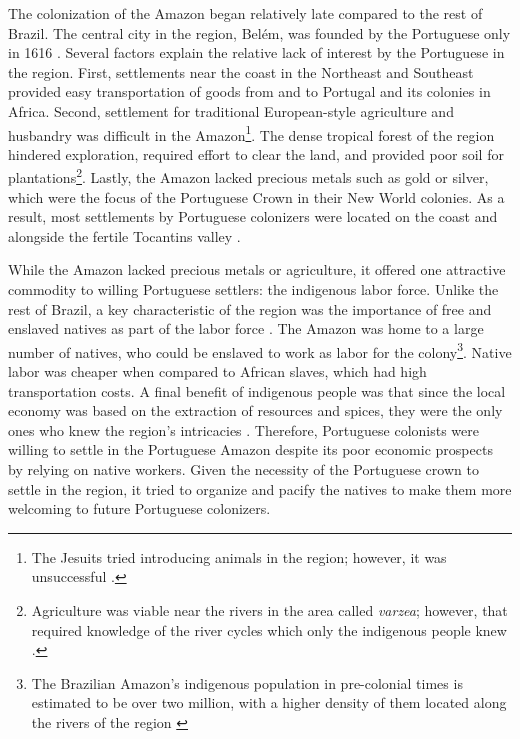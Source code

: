 \documentclass{article}
\begin{document}
The colonization of the Amazon began relatively late compared to the rest of Brazil. 
The central city in the region, Belém, was founded by the Portuguese only in 1616 \parencite{Chambouleyron2019-tm}. Several factors explain the relative lack of interest by the Portuguese in the region. 
First, settlements near the coast in the Northeast and Southeast provided easy transportation of goods from and to Portugal and its colonies in Africa. 
Second, settlement for traditional European-style agriculture and husbandry was difficult in the Amazon\footnote{The Jesuits tried introducing animals in the region; however, it was unsuccessful \parencite[p.]{Hoornaert1992-vx}.}. 
The dense tropical forest of the region hindered exploration, required effort to clear the land, and provided poor soil for plantations\footnote{
  Agriculture was viable near the rivers in the area called \textit{varzea}; however, that required knowledge of the river cycles which only the indigenous people knew \parencite[p.15-16]{Hoornaert1992-vx}.}. 
Lastly, the Amazon lacked precious metals such as gold or silver, which were the focus of the Portuguese Crown in their New World colonies. 
As a result, most settlements by Portuguese colonizers were located on the coast and alongside the fertile Tocantins valley \parencites[p.~44]{De_Assis_Costa2018-nt}{Chambouleyron2019-tr}.

While the Amazon lacked precious metals or agriculture, it offered one attractive commodity to willing Portuguese settlers: the indigenous labor force. 
Unlike the rest of Brazil, a key characteristic of the region was the importance of free and enslaved natives as part of the labor force \parencite{Chambouleyron2019-tm}. 
The Amazon was home to a large number of natives, who could be enslaved to work as labor for the colony\footnote{
  The Brazilian Amazon's indigenous population in pre-colonial times is estimated to be over two million, with a higher density of them located along the rivers of the region \parencites{Melatti2007-yn} {Denevan1992-qt}[p.~119]{Bethell1984-eo}}. 
Native labor was cheaper when compared to African slaves, which had high transportation costs.
A final benefit of indigenous people was that since the local economy was based on the extraction of resources and spices, they were the only ones who knew the region's intricacies \parencite{Parker1989-ul}.
Therefore, Portuguese colonists were willing to settle in the Portuguese Amazon despite its poor economic prospects by relying on native workers. 
Given the necessity of the Portuguese crown to settle in the region, it tried to organize and pacify the natives to make them more welcoming to future Portuguese colonizers.
\end{document}
